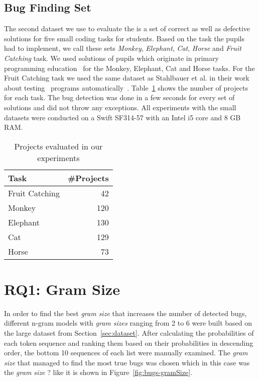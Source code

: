 \subsection{Bug Finding Set}\label{subsec:bugset}
The second dataset we use to evaluate the \ngram{} is a set of correct as well as defective solutions for five small coding tasks for students. Based on the task the pupils had to implement, we call these sets \textit{Monkey}, \textit{Elephant}, \textit{Cat}, \textit{Horse} and \textit{Fruit Catching} task.
We used solutions of pupils which originate in primary programming education~\cite{katharina} for the Monkey, Elephant, Cat and Horse tasks. For the Fruit Catching task we used the same dataset as Stahlbauer et al. in their work about testing \scratch\ programs automatically~\cite{whisker}. Table~\ref{tab:big-dataset} shows the number of projects for each task. The bug detection was done in a few seconds for every set of solutions and did not throw any exceptions. All experiments with the small datasets were conducted on a Swift SF314-57 with an Intel i5 core and 8 GB RAM.

 
\begin{table}[H]
    \centering
    \caption[Projects evaluated in our experiments]{\label{tab:big-dataset}Projects evaluated in our experiments}
    \begin{tabular}{lr}
        \toprule
        Task & \#Projects \\
        \midrule
        Fruit Catching & 42 \\
        Monkey & 120 \\
        Elephant & 130 \\
        Cat & 129 \\
        Horse & 73 \\
        \bottomrule
    \end{tabular}
\end{table}


\section{RQ1: Gram Size}\label{sec:gram_size}
In order to find the best \textit{gram size} that increases the number of detected bugs, different n-gram models with \textit{gram sizes} ranging from 2 to 6 were built based on the large dataset from Section~\ref{sec:dataset}. After calculating the probabilities of each token sequence and ranking them based on their probabilities in descending order, the bottom 10 sequences of each list were manually examined. The \textit{gram size} that managed to find the most true bugs was chosen which in this case was the \textit{gram size} ? like it is shown in Figure~\ref{fig:bugs-gramSize}. 

